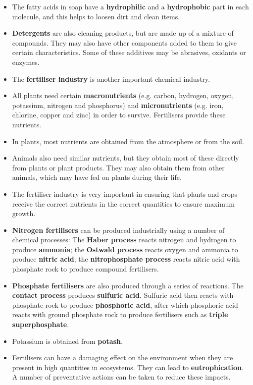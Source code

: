 \begin{itemize}
\item{The fatty acids in soap have a \textbf{hydrophilic} and a \textbf{hydrophobic} part in each molecule, and this helps to loosen dirt and clean items.}
\item{\textbf{Detergents} are also cleaning products, but are made up of a mixture of compounds. They may also have other components added to them to give certain characteristics. Some of these additives may be abrasives, oxidants or enzymes.}
\item{The \textbf{fertiliser industry} is another important chemical industry.}
\item{All plants need certain \textbf{macronutrients} (e.g. carbon, hydrogen, oxygen, potassium, nitrogen and phosphorus) and \textbf{micronutrients} (e.g. iron, chlorine, copper and zinc) in order to survive. Fertilisers provide these nutrients.}
\item{In plants, most nutrients are obtained from the atmosphere or from the soil.}
\item{Animals also need similar nutrients, but they obtain most of these directly from plants or plant products. They may also obtain them from other animals, which may have fed on plants during their life.}
\item{The fertiliser industry is very important in ensuring that plants and crops receive the correct nutrients in the correct quantities to ensure maximum growth.} 
\item{\textbf{Nitrogen fertilisers} can be produced industrially using a number of chemical processes: The \textbf{Haber process} reacts nitrogen and hydrogen to produce \textbf{ammonia}; the \textbf{Ostwald process} reacts oxygen and ammonia to produce \textbf{nitric acid}; the \textbf{nitrophosphate process} reacts nitric acid with phosphate rock to produce compound fertilisers.}
\item{\textbf{Phosphate fertilisers} are also produced through a series of reactions. The \textbf{contact process} produces \textbf{sulfuric acid}. Sulfuric acid then reacts with phosphate rock to produce \textbf{phosphoric acid}, after which phosphoric acid reacts with ground phosphate rock to produce fertilisers such as \textbf{triple superphosphate}.}
\item{Potassium is obtained from \textbf{potash}.}
\item{Fertilisers can have a damaging effect on the environment when they are present in high quantities in ecosystems. They can lead to \textbf{eutrophication}. A number of preventative actions can be taken to reduce these impacts.}

\end{itemize}
